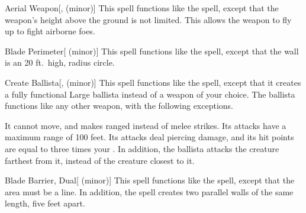 \lowercase{\hypertarget{spell:Aerial Weapon}{}}\label{spell:Aerial Weapon}
\begin{freeability}[\nth{2}]{\hypertarget{spell:Aerial Weapon}{Aerial Weapon}}[,  (minor)]
This spell functions like the  spell, except that the weapon's height above the ground is not limited.
This allows the weapon to fly up to fight airborne foes.
\end{freeability}
\vspace{0.25em}



\lowercase{\hypertarget{spell:Blade Perimeter}{}}\label{spell:Blade Perimeter}
\begin{freeability}[\nth{2}]{\hypertarget{spell:Blade Perimeter}{Blade Perimeter}}[ (minor)]
This spell functions like the  spell, except that the wall is an 20 ft.\ high, \areamed radius circle.
\end{freeability}
\vspace{0.25em}



\lowercase{\hypertarget{spell:Create Ballista}{}}\label{spell:Create Ballista}
\begin{freeability}[\nth{2}]{\hypertarget{spell:Create Ballista}{Create Ballista}}[,  (minor)]
This spell functions like the  spell, except that it creates a fully functional Large ballista instead of a weapon of your choice.
The ballista functions like any other weapon, with the following exceptions.

It cannot move, and makes ranged  instead of melee strikes.
Its attacks have a maximum range of 100 feet.
Its attacks deal piercing damage, and its hit points are equal to three times your .
In addition, the ballista attacks the creature farthest from it, instead of the creature closest to it.
\end{freeability}
\vspace{0.25em}



\lowercase{\hypertarget{spell:Blade Barrier, Dual}{}}\label{spell:Blade Barrier, Dual}
\begin{freeability}[\nth{3}]{\hypertarget{spell:Blade Barrier, Dual}{Blade Barrier, Dual}}[ (minor)]
This spell functions like the  spell, except that the area must be a line.
In addition, the spell creates two parallel walls of the same length, five feet apart.
\end{freeability}
\vspace{0.25em}



